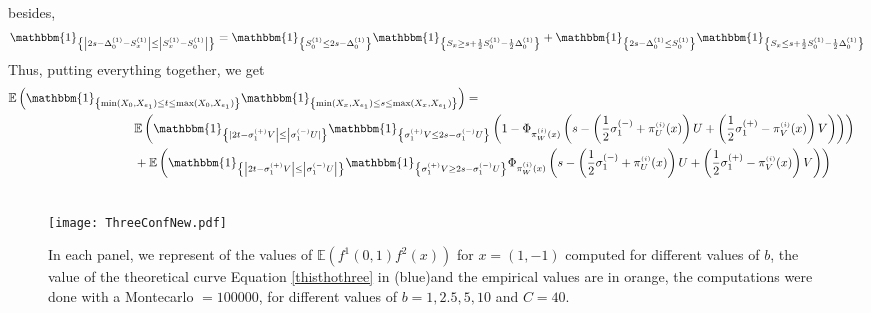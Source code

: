 \documentclass[12pt]{article}
\theoremstyle{Theorem}
\theoremstyle{definition}
\begin{document}
besides,  
\begin{align*}
\mathbbm{1}_{\left\{ \left|2s - \Delta^{(1)}_{0} -  S^{\scriptscriptstyle (1)}_{x}  \right| \leq \left|S^{\scriptscriptstyle (1)}_{x} - S^{\scriptscriptstyle (1)}_{0}\right|\right\}} 
&= \mathbbm{1}_{\left\{  S^{\scriptscriptstyle (1)}_{0} \leq 2s - \Delta^{(1)}_{0}\right\}} \mathbbm{1}_{\left\{ S_{x} \geq s+ \frac{1}{2}S^{\scriptscriptstyle (1)}_{0} - \frac{1}{2}\Delta^{\scriptscriptstyle (1)}_{0}\right\}} + \mathbbm{1}_{\left\{  2s - \Delta^{(1)}_{0} \leq S^{\scriptscriptstyle (1)}_{0} \right\}} \mathbbm{1}_{\left\{ S_{x} \leq  s+ \frac{1}{2}S^{\scriptscriptstyle (1)}_{0} - \frac{1}{2}\Delta^{\scriptscriptstyle (1)}_{0} \right\}} \\
\end{align*} 
Thus, putting everything together, we get 
{\small 
\begin{align*}
\mathbb{E}\left(\mathbbm{1}_{\left\{\min(X_{\scriptscriptstyle 0}, X_{e_1}) \leq t \leq \max(X_{\scriptscriptstyle 0}, X_{e_1})\right\}}\mathbbm{1}_{\left\{\min(X_{x}, X_{e_1}) \leq s \leq \max(X_{x}, X_{e_1}) \right\}}\right) = \\
& \hspace{-10cm} \mathbb{E}\left(\mathbbm{1}_{\left\{|2t - \sigma^{(+)}_{1}V\right| \leq  \left|\sigma^{(-)}_{1}U|\right\}}\mathbbm{1}_{\left\{ \sigma^{(+)}_{1}V  \leq 2s - \sigma^{(-)}_{1}U\right\}} \left(1 - \Phi_{\pi^{\scriptscriptstyle(i)}_{W}(x) }\left(s - \left(\frac{1}{2}\sigma^{(-)}_{1} + \pi^{\scriptscriptstyle(i)}_{U}(x)\right)U  +  \left(\frac{1}{2}\sigma^{(+)}_{1} - \pi^{\scriptscriptstyle(i)}_{V}(x)\right)V\right)\right)\right)\\
& \hspace{-10cm}+ \mathbb{E}\left(\mathbbm{1}_{\left\{\left|2t - \sigma^{(+)}_{1}V\right|\leq  \left|\sigma^{(-)}_{1}U\right|\right\}}\mathbbm{1}_{\left\{ \sigma^{(+)}_{1}V  \geq 2s - \sigma^{(-)}_{1}U\right\}}\Phi_{\pi^{\scriptscriptstyle(i)}_{W}(x) }\left(s - \left(\frac{1}{2}\sigma^{(-)}_{1} + \pi^{\scriptscriptstyle(i)}_{U}(x)\right)U  +  \left(\frac{1}{2}\sigma^{(+)}_{1}- \pi^{\scriptscriptstyle(i)}_{V}(x)\right)V\right) \right)\\\
\end{align*}
}
\begin{figure}[H]
  \centering
    {\texttt{[image: ThreeConfNew.pdf]}}
    \hspace{0.2cm}
 \caption{In each panel, we represent of the values of $\mathbb{E}\left(f^{1}(0,1)f^{2}(x)\right)$ for $x = (1,-1)$ computed for different values of $b$, the value of the theoretical curve Equation \eqref{thisthothree} in (blue)and the empirical values are in orange, the computations were done with a Montecarlo $= 100000$, for different values of $b = 1, 2.5, 5, 10$ and $C = 40$. }
\label{fig2}
\end{figure}
\end{document}
